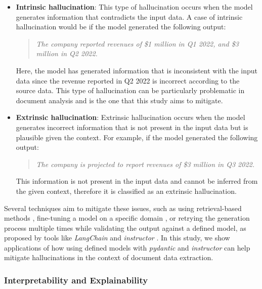 \documentclass[english, 12pt, a4paper, elec, utf8, a-2b, online]{aaltothesis}
\begin{document}
\begin{itemize}
    \label{list:hallucinations:1}
    \item \textbf{Intrinsic hallucination}: This type of hallucination occurs when the model generates information that contradicts the input data.
    A case of intrinsic hallucination would be if the model generated the following output:
    \begin{quote}
        \textit{The company reported revenues of \$1 million in Q1 2022, and \$3 million in Q2 2022.}
    \end{quote}
    Here, the model has generated information that is inconsistent with the input data since the revenue reported in Q2 2022 is incorrect according to the source data.
    This type of hallucination can be particularly problematic in document analysis and is the one that this study aims to mitigate.
    \item \textbf{Extrinsic hallucination}: Extrinsic hallucination occurs when the model generates incorrect information that is not present in the input data but is plausible given the context.
    For example, if the model generated the following output:
    \begin{quote}
        \textit{The company is projected to report revenues of \$3 million in Q3 2022.}
    \end{quote}
    This information is not present in the input data and cannot be inferred from the given context, therefore it is classified as an extrinsic hallucination.
\end{itemize}

Several techniques aim to mitigate these issues, such as using retrieval-based methods \cite{lewis2020retrievalaugmented}, fine-tuning a model on a specific domain \cite{Brown2020}, or retrying the generation process multiple times while validating the output against a defined model, as proposed by tools like \textit{LangChain} \cite{Chase_LangChain_2022} and \textit{instructor} \cite{Instructor2023}.
In this study, we show applications of how using defined models with \textit{pydantic} \cite{pydantic} and \textit{instructor} can help mitigate hallucinations in the context of document data extraction.

\subsubsection{Interpretability and Explainability}
\end{document}
